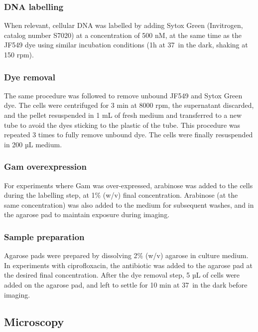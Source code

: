 \subsubsection*{DNA labelling}
When relevant, cellular DNA was labelled by adding Sytox Green (Invitrogen, catalog number S7020) at a concentration of 500 nM, at the same time as the JF549 dye using similar incubation conditions (1h at 37\celsius\ in the dark, shaking at 150 rpm).
\subsubsection*{Dye removal}
The same procedure was followed to remove unbound JF549 and Sytox Green dye. The cells were centrifuged for 3 min at 8000 rpm, the supernatant discarded, and the pellet resuspended in 1 mL of fresh medium and transferred to a new tube to avoid the dyes sticking to the plastic of the tube. This procedure was repeated 3 times to fully remove unbound dye. The cells were finally resuspended in 200 µL medium.
\subsubsection*{Gam overexpression}
For experiments where Gam was over-expressed, arabinose was added to the cells during the labelling step, at 1\% (w/v) final concentration. Arabinose (at the same concentration) was also added to the medium for subsequent washes, and in the agarose pad to maintain exposure during imaging.
\subsubsection*{Sample preparation}
Agarose pads were prepared by dissolving 2\% (w/v) agarose in culture medium. In experiments with ciprofloxacin, the antibiotic was added to the agarose pad at the desired final concentration. After the dye removal step, 5 µL of cells were added on the agarose pad, and left to settle for 10 min at 37\celsius\ in the dark before imaging.

\subsection*{Microscopy}
